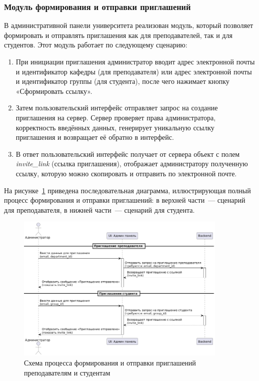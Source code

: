 \subsubsection{Модуль формирования и отправки приглашений}
В административной панели университета реализован модуль, который позволяет формировать и отправлять приглашения как для преподавателей, так и для студентов. Этот модуль работает по следующему сценарию:

\begin{enumerate}
    \item При инициации приглашения администратор вводит адрес электронной почты и идентификатор кафедры (для преподавателя) или адрес электронной почты и идентификатор группы (для студента), после чего нажимает кнопку «Сформировать ссылку».

    \item Затем пользовательский интерфейс отправляет запрос на создание приглашения на сервер. Сервер проверяет права администратора, корректность введённых данных, генерирует уникальную ссылку приглашения и возвращает её обратно в интерфейс.

    \item В ответ пользовательский интерфейс получает от сервера объект с полем \textit{invite\_link} (ссылка приглашения), отображает администратору полученную ссылку, которую можно скопировать и отправить по электронной почте.
\end{enumerate}

На рисунке~\ref{fig:admin-invite} приведена последовательная диаграмма, иллюстрирующая полный процесс формирования и отправки приглашений: в верхней части~--- сценарий для преподавателя, в нижней части~--- сценарий для студента.

\begin{figure}[h]
    \centering
    \includegraphics[width=0.9\textwidth]{static/diagrams/Admin.png}
    \caption{Схема процесса формирования и отправки приглашений преподавателям и студентам}
    \label{fig:admin-invite}
\end{figure}

